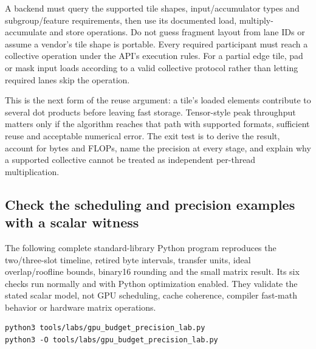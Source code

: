 A backend must query the supported tile shapes, input/accumulator types and subgroup/feature requirements, then use its documented load, multiply-accumulate and store operations. Do not guess fragment layout from lane IDs or assume a vendor's tile shape is portable. Every required participant must reach a collective operation under the API's execution rules. For a partial edge tile, pad or mask input loads according to a valid collective protocol rather than letting required lanes skip the operation.

This is the next form of the reuse argument: a tile's loaded elements contribute to several dot products before leaving fast storage. Tensor-style peak throughput matters only if the algorithm reaches that path with supported formats, sufficient reuse and acceptable numerical error. The exit test is to derive the result, account for bytes and FLOPs, name the precision at every stage, and explain why a supported collective cannot be treated as independent per-thread multiplication.

\subsection{Check the scheduling and precision examples with a scalar witness}\label{03-visual-computing-i-ch016-check-the-scheduling-and-precision-examples-with-a-scalar-witness}

The following complete standard-library Python program reproduces the two/three-slot timeline, retired byte intervals, transfer units, ideal overlap/roofline bounds, binary16 rounding and the small matrix result. Its six checks run normally and with Python optimization enabled. They validate the stated scalar model, not GPU scheduling, cache coherence, compiler fast-math behavior or hardware matrix operations.

\begin{verbatim}
python3 tools/labs/gpu_budget_precision_lab.py
python3 -O tools/labs/gpu_budget_precision_lab.py
\end{verbatim}


